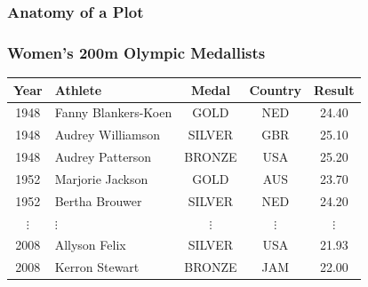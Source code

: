 \documentclass{beamer}
\begin{document}
\begin{frame}
\frametitle{Anatomy of a Plot}

\end{frame}


\begin{frame}[fragile]
\frametitle{Women's 200m Olympic Medallists}
\footnotesize{
\begin{center}
\begin{tabular}{clccc}
\toprule
Year & Athlete & Medal & Country & Result \\
\midrule
1948 & Fanny Blankers-Koen & GOLD & NED & 24.40 \\
1948 & Audrey Williamson & SILVER & GBR & 25.10 \\
1948 & Audrey Patterson & BRONZE & USA & 25.20 \\
1952 & Marjorie Jackson & GOLD & AUS & 23.70 \\
1952 & Bertha Brouwer & SILVER & NED & 24.20 \\
$\vdots$ & $\vdots$ & $\vdots$ & $\vdots$ & $\vdots$ \\
2008 & Allyson Felix & SILVER & USA & 21.93 \\
2008 & Kerron Stewart & BRONZE & JAM & 22.00 \\
\bottomrule
\end{tabular}
\end{center}
}
\end{frame}
\end{document}
